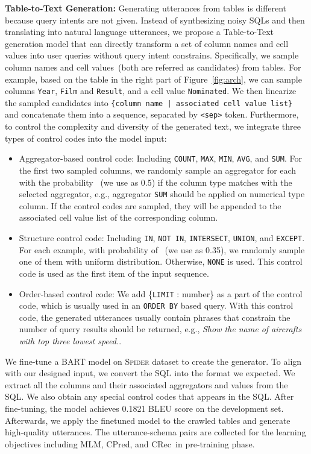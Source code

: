 \documentclass[letterpaper]{article} \usepackage{aaai21}  \usepackage{times}  \usepackage{helvet} \usepackage{courier}  \usepackage[hyphens]{url}  \usepackage{graphicx} \usepackage{booktabs}
\newcommand{\colpred}{CPred}
\newcommand{\colrec}{CRec}
\begin{document}
\smallskip \noindent \textbf{Table-to-Text Generation:}
Generating utterances from tables is different because query intents are not given.
Instead of synthesizing noisy SQLs and then translating into natural language utterances, we propose a Table-to-Text generation model that can directly transform a set of column names and cell values into user queries without query intent constrains.
Specifically, we sample column names and cell values~(both are referred as candidates) from tables. 
For example, based on the table in the right part of Figure~\ref{fig:arch}, we can sample columns \texttt{Year}, \texttt{Film} and \texttt{Result}, and a cell value \texttt{Nominated}.
We then linearize the sampled candidates into \texttt{\{column name | associated cell value list\}} and concatenate them into a sequence, separated by \texttt{<sep>} token.
Furthermore, to control the complexity and diversity of the generated text, we integrate three types of control codes into the model input:
\begin{itemize}
\item Aggregator-based control code: Including \texttt{COUNT}, \texttt{MAX}, \texttt{MIN}, \texttt{AVG}, and \texttt{SUM}.
For the first two sampled columns, we randomly sample an aggregator for each with the probability ~(we use  as 0.5) 
if the column type matches with the selected aggregator, e.g., aggregator \texttt{SUM} should be applied on numerical type column.
If the control codes are sampled, they will be appended to the associated cell value list of the corresponding column.
\item Structure control code: Including \texttt{IN}, \texttt{NOT IN}, \texttt{INTERSECT}, \texttt{UNION}, and \texttt{EXCEPT}. 
For each example, with probability of ~(we use  as 0.35), we randomly sample one of them with uniform distribution. Otherwise, \texttt{NONE} is used.
This control code is used as the first item of the input sequence.
\item Order-based control code: We add \{\texttt{LIMIT} : number\} as a part of the control code, which is usually used in an \texttt{ORDER BY} based query.
With this control code, the generated utterances usually contain phrases that constrain the number of query results should be returned, e.g., \textit{Show the name of aircrafts with top three lowest speed.}.

\end{itemize}

We fine-tune a BART model on \textsc{Spider} dataset to create the generator.
To align with our designed input, we convert the SQL into the format we expected.
We extract all the columns and their associated aggregators and values from the SQL. 
We also obtain any special control codes that appears in the SQL.
After fine-tuning, the model achieves 0.1821 BLEU score on the development set.
Afterwards, we apply the finetuned model to the crawled tables and generate high-quality utterances.
The utterance-schema pairs are collected for the learning objectives including MLM, \colpred, and \colrec~in pre-training phase.
\end{document}
